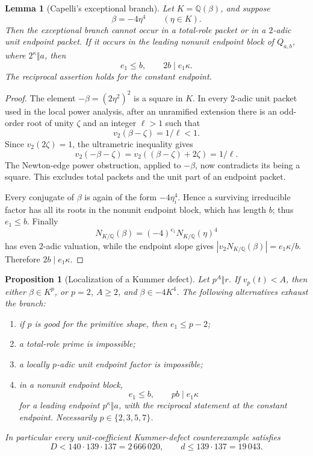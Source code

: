 \documentclass[11pt]{article}
\numberwithin{equation}{section}
\newtheorem{proposition}[theorem]{Proposition}
\newtheorem{lemma}[theorem]{Lemma}
\theoremstyle{definition}
\newcommand{\Q}{\mathbb Q}
\begin{document}
\begin{lemma}[Capelli's exceptional branch]\label{lem:exceptionalfourth}
Let \(K=\Q(\beta)\), and suppose
\[
 \beta=-4\eta^4\qquad(\eta\in K).
\]
Then the exceptional branch cannot occur in a total-role packet or in a
\(2\)-adic unit endpoint packet.  If it occurs in the leading nonunit
endpoint block of \(Q_{a,b}\), where \(2^\kappa\Vert a\), then
\begin{equation}
 e_1\leq b,\qquad 2b\mid e_1\kappa.
 \label{eq:19-10}
\end{equation}
The reciprocal assertion holds for the constant endpoint.
\end{lemma}

\begin{proof}
The element \(-\beta=(2\eta^2)^2\) is a square in \(K\).  In every
\(2\)-adic unit packet used in the local power analysis, after an unramified
extension there is an odd-order root of unity \(\zeta\) and an integer
\(\ell>1\) such that
\[
 v_2(\beta-\zeta)=1/\ell<1.
\]
Since \(v_2(2\zeta)=1\), the ultrametric inequality gives
\[
 v_2(-\beta-\zeta)=v_2((\beta-\zeta)+2\zeta)=1/\ell.
\]
The Newton-edge power obstruction, applied to \(-\beta\), now contradicts
its being a square.  This excludes total packets and the unit part of an
endpoint packet.

Every conjugate of \(\beta\) is again of the form \(-4\eta_i^4\).  Hence a
surviving irreducible factor has all its roots in the nonunit endpoint block,
which has length \(b\); thus \(e_1\leq b\).  Finally
\[
 N_{K/\Q}(\beta)=(-4)^{e_1}N_{K/\Q}(\eta)^4
\]
has even \(2\)-adic valuation, while the endpoint slope gives
\(|v_2N_{K/\Q}(\beta)|=e_1\kappa/b\).  Therefore
\(2b\mid e_1\kappa\).
\end{proof}

\begin{proposition}[Localization of a Kummer defect]
\label{prop:defectlocalization}
Let \(p^A\Vert r\).  If \(v_p(t)<A\), then either
\(\beta\in K^p\), or \(p=2\), \(A\geq2\), and
\(\beta\in-4K^4\).  The following alternatives exhaust the branch:
\begin{enumerate}[label=(\alph*)]
\item if \(p\) is good for the primitive shape, then \(e_1\leq p-2\);
\item a total-role prime is impossible;
\item a locally \(p\)-adic unit endpoint factor is impossible;
\item in a nonunit endpoint block,
\[
 e_1\leq b,\qquad pb\mid e_1\kappa
\]
for a leading endpoint \(p^\kappa\Vert a\), with the reciprocal statement
at the constant endpoint.  Necessarily \(p\in\{2,3,5,7\}\).
\end{enumerate}
In particular every unit-coefficient Kummer-defect counterexample satisfies
\begin{equation}
 D<140\cdot139\cdot137=2\,666\,020,
 \qquad d\leq139\cdot137=19\,043.
 \label{eq:19-11}
\end{equation}
\end{proposition}
\end{document}
